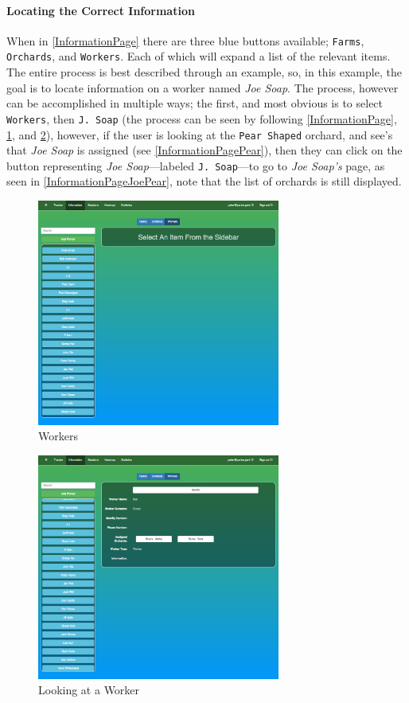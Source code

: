 \documentclass[11pt]{article}
\begin{document}
\paragraph{Locating the Correct Information}When in \ref{InformationPage} there are three blue buttons available; \texttt{Farms}, \texttt{Orchards}, and \texttt{Workers}. Each of which will expand a list of the relevant items. The entire process is best described through an example, so, in this example, the goal is to locate information on a worker named \textit{Joe Soap}. The process, however can be accomplished in multiple ways; the first, and most obvious is to select \texttt{Workers}, then \texttt{J. Soap} (the process can be seen by following \ref{InformationPage}, \ref{InformationPageWorkers}, and \ref{InformationPageJoe}), however, if the user is looking at the \texttt{Pear Shaped} orchard, and see's that \textit{Joe Soap} is assigned (see \ref{InformationPagePear}), then they can click on the button representing \textit{Joe Soap}---labeled \texttt{J. Soap}---to go to \textit{Joe Soap's} page, as seen in \ref{InformationPageJoePear}, note that the list of orchards is still displayed.

\begin{figure}
 \centering
 \includegraphics[width=8cm, keepaspectratio]{Images/UsingSystem/WebWorkers.png}
 \caption{Workers}
 \label{InformationPageWorkers}
\end{figure}

\begin{figure}
 \centering
 \includegraphics[width=8cm, keepaspectratio]{Images/UsingSystem/WebWorker.png}
 \caption{Looking at a Worker}
 \label{InformationPageJoe}
\end{figure}
\end{document}
